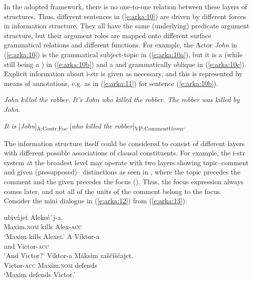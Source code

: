 \documentclass[output=paper
,modfonts
,nonflat]{langsci/langscibook}
\begin{document}
In the adopted framework, there is no one-to-one relation between these layers of structures. Thus, different sentences in (\ref{e:arka:10}) are driven by different forces in information structure. They all have the same (underlying) predicate argument structure, but their argument roles are mapped onto different surface grammatical relations and different  functions. For example, the Actor \textit{John} in (\ref{e:arka:10}) is the grammatical subject-topic in (\ref{e:arka:10a}), but it is a  (while still being a ) in (\ref{e:arka:10b}) and a  and grammatically oblique in (\ref{e:arka:10c}). Explicit information about i-str is given as necessary, and this is represented by means of annotations, e.g. as in (\ref{e:arka:11}) for sentence (\ref{e:arka:10b}). 

\begin{exe}
	\ex\label{e:arka:10}
	\begin{xlist}
		\ex\label{e:arka:10a}
		\textit{John killed the robber.} 
		\ex\label{e:arka:10b}
		\textit{It’s John who killed the robber.}  
		\ex\label{e:arka:10c}
		\textit{The robber was killed by John.}
	\end{xlist}
\end{exe}

\begin{exe}
	\ex\label{e:arka:11}
	\textit{It is} [\textit{John}]\textsubscript{A:Contr.Foc} [\textit{who killed}  \textit{the robber}]\textsubscript{VP:Comment{\textbar}G}\textsubscript{iven}.
\end{exe}

\noindent
The information structure itself could be considered to consist of different layers with different possible associations of clausal constituents. For example, the i-str system at the broadest level may operate with two layers showing topic–comment and given (presup\-posed)– distinctions as seen in , where the topic precedes the comment and the given precedes the focus (\citealt[405]{Foley2007info,Comrie1987}). Thus, the focus expression always comes later, and not all of the units of the comment belong to the focus. Consider the mini dialogue in (\ref{e:arka:12}) from  (\ref{e:arka:13}). 

\begin{exe}
	\ex\label{e:arka:12}
	\begin{xlist}
		\label{e12s}
		\gll {}   ubivájet   Aleksé´j-a.     {\USOParen}\ili{Russian}{\USCParen}\\
		Maxim.\textsc{nom}   kills   Alex-\textsc{acc}\\
		\glt ‘Maxim kills Alexei.’
		\label{e12q}
		\gll A   Víktor-a{\USQMark}\\
		and   Victor-\textsc{acc}\\
		\glt ‘And Victor?’
		\label{e:arka:12a}
		\gll Víktor-a  Máksim   zaščǐščajet.\\
		Victor-\textsc{acc}   Maxim.\textsc{nom}  defends\\
		\glt ‘Maxim defends Victor.’      \citep[96]{Comrie1987}
	\end{xlist}
\end{exe}
\end{document}
